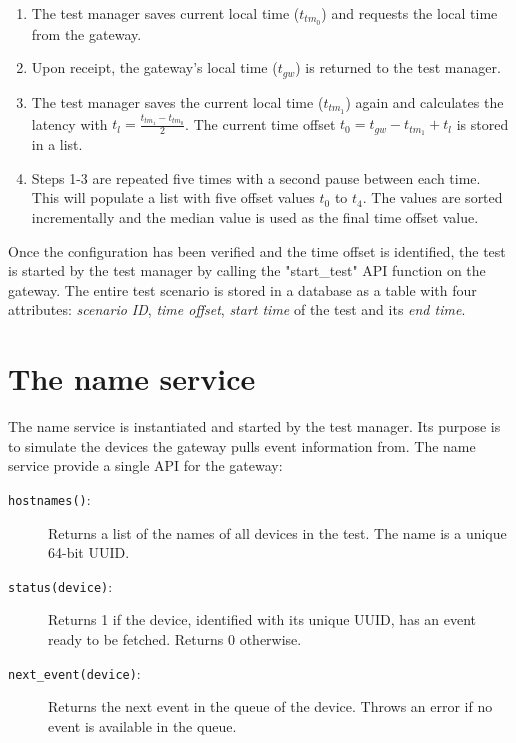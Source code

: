 \begin{enumerate}
    \item The test manager saves current local time ($t_{tm_0}$) and requests the
local time from the gateway.
    \item Upon receipt, the gateway's local time ($t_{gw}$) is returned to the
test manager.
    \item The test manager saves the current local time ($t_{tm_1}$) again and
calculates the latency with $t_l = \frac{t_{tm_1} - t_{tm_0}}{2}$. The current time
offset $t_0 = t_{gw} - t_{tm_1} + t_l$ is stored in a list.
    \item Steps 1-3 are repeated five times with a second pause between each
time. This will populate a list with five offset values $t_0$ to $t_4$. The
values are sorted incrementally and the median value is used as the final
time offset value.
\end{enumerate}

Once the configuration has been verified and the time offset is identified, the
test is started by the test manager by calling the "start\_test" API function on
the gateway. The entire test scenario is stored in a database as a table with
four attributes: \textit{scenario ID}, \textit{time offset}, \textit{start
time} of the test and its \textit{end time}.


\section{The name service}

The name service is instantiated and started by the test manager. Its purpose
is to simulate the devices the gateway pulls event information from. The name
service provide a single API for the gateway:

\begin{description}
    \item[\texttt{hostnames()}:] Returns a list of the names of all devices in
the test. The name is a unique 64-bit UUID.
    \item[\texttt{status(device)}:] Returns 1 if the device, identified with
its unique UUID, has an event ready to be fetched. Returns 0 otherwise.
    \item[\texttt{next\_event(device)}:] Returns the next event in the queue of
the device. Throws an error if no event is available in the queue.
\end{description}

